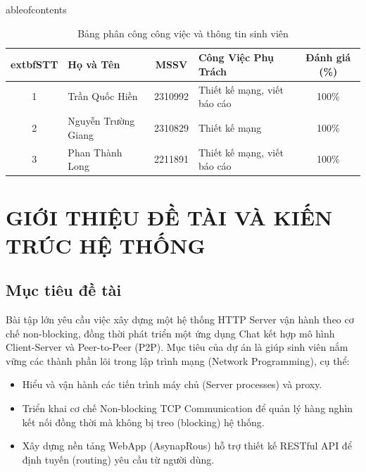 \documentclass[a4paper,12pt]{article}
\begin{document}
\newpage
	ableofcontents
\newpage
\begin{table}[h]
    \centering
    \renewcommand{\arraystretch}{1.3} %
    \setlength{\tabcolsep}{5pt} %
    \begin{tabular}{|c|l|c|p{5cm}|c|}  %
        \hline
        	extbf{STT} & \textbf{Họ và Tên} & \textbf{MSSV} & \textbf{Công Việc Phụ Trách} & \textbf{Đánh giá (\%)}\\
        \hline
        1 & Trần Quốc Hiền & 2310992 & Thiết kế mạng, viết báo cáo  & 100\% \\
        \hline
        2 & Nguyễn Trường Giang & 2310829 & Thiết kế mạng & 100\%  \\
        \hline
        3 & Phan Thành Long & 2211891 & Thiết kế mạng, viết báo cáo & 100\% \\
        \hline
    \end{tabular}
    \caption{Bảng phân công công việc và thông tin sinh viên}
    \label{tab:phancong}
\end{table}
\newpage
\section{GIỚI THIỆU ĐỀ TÀI VÀ KIẾN TRÚC HỆ THỐNG}

\subsection{Mục tiêu đề tài}
Bài tập lớn yêu cầu việc xây dựng một hệ thống HTTP Server vận hành theo cơ chế non-blocking, đồng thời phát triển một ứng dụng Chat kết hợp mô hình Client-Server và Peer-to-Peer (P2P). Mục tiêu của dự án là giúp sinh viên nắm vững các thành phần lõi trong lập trình mạng (Network Programming), cụ thể:
\begin{itemize}
    \item Hiểu và vận hành các tiến trình máy chủ (Server processes) và proxy.
    \item Triển khai cơ chế Non-blocking TCP Communication để quản lý hàng nghìn kết nối đồng thời mà không bị treo (blocking) hệ thống.
    \item Xây dựng nền tảng WebApp (AsynapRous) hỗ trợ thiết kế RESTful API để định tuyến (routing) yêu cầu từ người dùng.
\end{itemize}
\end{document}
